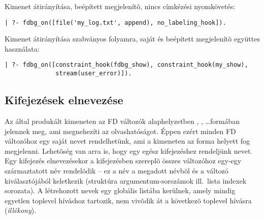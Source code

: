 Kimenet átirányítása, beépített megjelenítõ, nincs címkézési nyomkövetés:

\begin{verbatim}
| ?- fdbg_on([file('my_log.txt', append), no_labeling_hook]).
\end{verbatim}

Kimenet átirányítása szabványos folyamra, saját és beépített
megjelenítõ együttes használata:

\begin{verbatim}
| ?- fdbg_on([constraint_hook(fdbg_show), constraint_hook(my_show),
              stream(user_error)]).
\end{verbatim}

\subsection{Kifejezések elnevezése}

Az \fdbg által produkált kimeneten az FD változók alaphelyzetben ,
, \ldots formában jelennek meg, ami megnehezíti az olvashatóságot.
Éppen ezért minden FD változóhoz egy saját nevet rendelhetünk, ami a kimeneten
az  forma helyett fog megjelenni. Lehetõség van arra is,
hogy egy egész kifejezéshez rendeljünk nevet. Egy kifejezés elnevezésekor a
kifejezésben szereplõ összes változóhoz egy-egy származtatott név
rendelõdik -- ez a név a megadott névbõl és a változó kiválasztójából
keletkezik (struktúra argumentum-sorszámok ill.\ lista indexek sorozata). A
létrehozott nevek egy globális listába kerülnek, amely mindig egyetlen toplevel
híváshoz tartozik, nem vivõdik át a következõ toplevel hívásra (\emph{illékony}).


